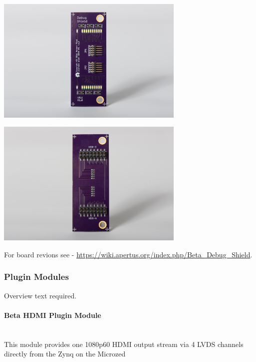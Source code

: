\begin{center}
\includegraphics[height=6cm]{images/Debug-shield-bot01}
\end{center}

\begin{center}
\includegraphics[height=6cm]{images/Debug-shield-top01}
\end{center}

For board revions see - \href{https://wiki.apertus.org/index.php/Beta_Debug_Shield}{https://wiki.apertus.org/index.php/Beta\_Debug\_Shield}.\\







\subsubsection{Plugin Modules}

Overview text required.

\paragraph{Beta HDMI Plugin Module}\mbox{}\\

This module provides one 1080p60 HDMI output stream via 4 LVDS channels directly from the Zynq on the Microzed 




